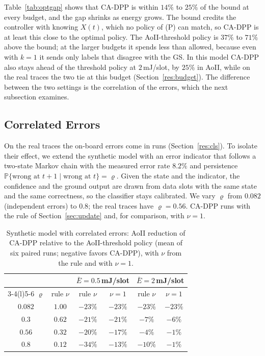 \documentclass[5p,twocolumn]{elsarticle}
\theoremstyle{remark}
\newcommand{\Prob}{\mathbb{P}}
\begin{document}
Table~\ref{tab:optgap} shows that CA-DPP is within $14\%$ to $25\%$ of the bound at every budget, and the gap shrinks as energy grows. The bound credits the controller with knowing $X(t)$, which no policy of (P) can match, so CA-DPP is at least this close to the optimal policy. The AoII-threshold policy is $37\%$ to $71\%$ above the bound; at the larger budgets it spends less than allowed, because even with $k=1$ it sends only labels that disagree with the GS. In this model CA-DPP also stays ahead of the threshold policy at $2$\,mJ/slot, by $25\%$ in AoII, while on the real traces the two tie at this budget (Section~\ref{res:budget}). The difference between the two settings is the correlation of the errors, which the next subsection examines.

\subsection{Correlated Errors}\label{res:corr}
On the real traces the on-board errors come in runs (Section~\ref{res:cls}). To isolate their effect, we extend the synthetic model with an error indicator that follows a two-state Markov chain with the measured error rate $8.2\%$ and persistence $\Prob\{\text{wrong at }t+1\mid\text{wrong at }t\}=\varrho$. Given the state and the indicator, the confidence and the ground output are drawn from data slots with the same state and the same correctness, so the classifier stays calibrated. We vary $\varrho$ from $0.082$ (independent errors) to $0.8$; the real traces have $\varrho=0.56$. CA-DPP runs with the rule of Section~\ref{sec:update} and, for comparison, with $\nu=1$.

\begin{table}[t]
\caption{Synthetic model with correlated errors: AoII reduction of CA-DPP relative to the AoII-threshold policy (mean of six paired runs; negative favors CA-DPP), with $\nu$ from the rule and with $\nu=1$.}\label{tab:corr}
\centering\footnotesize
\begin{tabular}{@{}cccccc@{}}
\toprule
 & & \multicolumn{2}{c}{$\bar E=0.5$\,mJ/slot} & \multicolumn{2}{c}{$\bar E=2$\,mJ/slot}\\
\cmidrule(lr){3-4}\cmidrule(l){5-6}
$\varrho$ & rule $\nu$ & rule $\nu$ & $\nu=1$ & rule $\nu$ & $\nu=1$\\
\midrule
$0.082$ & $1.00$ & $-23\%$ & $-23\%$ & $-23\%$ & $-23\%$\\
$0.3$ & $0.62$ & $-21\%$ & $-21\%$ & $-7\%$ & $-6\%$\\
$0.56$ & $0.32$ & $-20\%$ & $-17\%$ & $-4\%$ & $-1\%$\\
$0.8$ & $0.12$ & $-34\%$ & $-13\%$ & $-10\%$ & $-1\%$\\
\bottomrule
\end{tabular}
\end{table}
\end{document}
